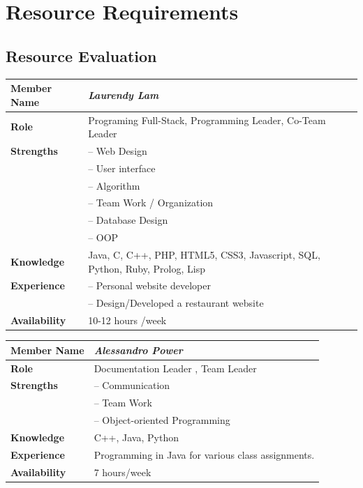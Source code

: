 \documentclass[12pt]{article}
\begin{document}
\section{Resource Requirements}

\subsection{Resource Evaluation}
\begin{center}
\begin{tabular}{ p{2.7cm} | p{9cm} }
\hline
\textbf{Member Name}	&	\textit{\textbf{Laurendy Lam}}	\\ \hline \hline
\textbf{Role}		&	Programing Full-Stack, Programming Leader, Co-Team Leader	\\ \hline
\textbf{Strengths}	&	-- Web Design	\\
			        &	-- User interface	\\
			        &	-- Algorithm	\\
					&	-- Team Work / Organization	\\
					&	-- Database Design	\\
					&	-- OOP	\\ \hline
\textbf{Knowledge}	&	Java, C, C++, PHP, HTML5, CSS3, Javascript, SQL, Python, Ruby, Prolog, Lisp	\\ \hline
\textbf{Experience}	&	-- Personal website developer	\\
					&	-- Design/Developed a restaurant website 	\\ \hline
\textbf{Availability}	&	10-12 hours /week	\\ \hline
\end{tabular}
\end{center}
%
\vspace{3mm}
%
\begin{center}
\begin{tabular}{ p{2.7cm} | p{9cm} }
\hline
\textbf{Member Name}	&	\textit{\textbf{Alessandro Power}}	\\ \hline \hline
\textbf{Role}		&	Documentation Leader , Team Leader	\\ \hline
\textbf{Strengths}	&	-- Communication	\\
					&	-- Team Work	\\
					&	-- Object-oriented Programming	\\ \hline
\textbf{Knowledge}	&	C++, Java, Python	\\ \hline
\textbf{Experience}	&	Programming in Java for various class assignments.	\\ \hline
\textbf{Availability}	&	7 hours/week	\\ \hline
\end{tabular}
\end{center}
\end{document}
